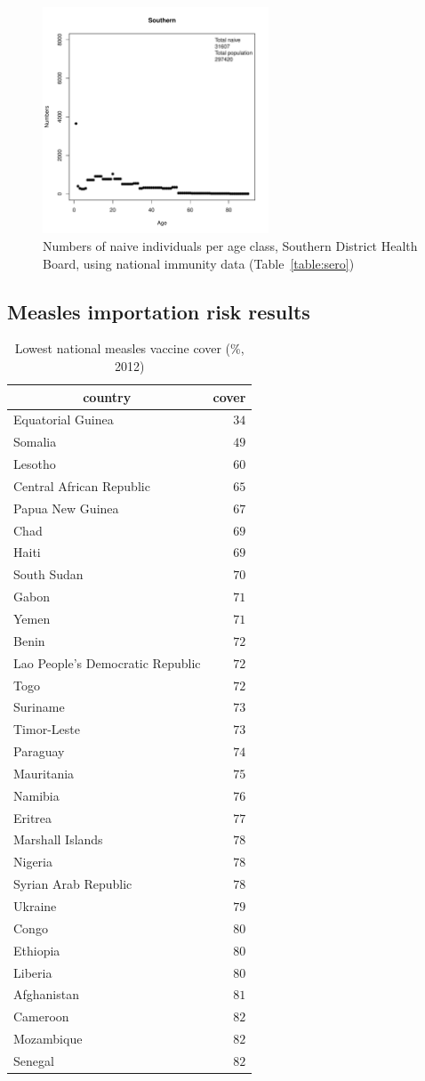 \documentclass{article}
\begin{document}
\begin{figure}[H]
     \begin{center}
     \includegraphics[width=0.6\textwidth]{dhb20.pdf}
     \end{center}
     \caption{Numbers of naive individuals per age class, Southern District Health Board, using national immunity data (Table~\ref{table:sero})}
     \label{fig:Southern}
\end{figure}

\subsection{Measles importation risk results}



\begin{table}
\caption{Lowest national measles vaccine cover (\%, 2012)}
\begin{center}
\begin{tabular}{lr}
\hline\hline
\multicolumn{1}{c}{country}&\multicolumn{1}{c}{cover}\tabularnewline
\hline
Equatorial Guinea&$34$\tabularnewline
Somalia&$49$\tabularnewline
Lesotho&$60$\tabularnewline
Central African Republic&$65$\tabularnewline
Papua New Guinea&$67$\tabularnewline
Chad&$69$\tabularnewline
Haiti&$69$\tabularnewline
South Sudan&$70$\tabularnewline
Gabon&$71$\tabularnewline
Yemen&$71$\tabularnewline
Benin&$72$\tabularnewline
Lao People's Democratic Republic&$72$\tabularnewline
Togo&$72$\tabularnewline
Suriname&$73$\tabularnewline
Timor-Leste&$73$\tabularnewline
Paraguay&$74$\tabularnewline
Mauritania&$75$\tabularnewline
Namibia&$76$\tabularnewline
Eritrea&$77$\tabularnewline
Marshall Islands&$78$\tabularnewline
Nigeria&$78$\tabularnewline
Syrian Arab Republic&$78$\tabularnewline
Ukraine&$79$\tabularnewline
Congo&$80$\tabularnewline
Ethiopia&$80$\tabularnewline
Liberia&$80$\tabularnewline
Afghanistan&$81$\tabularnewline
Cameroon&$82$\tabularnewline
Mozambique&$82$\tabularnewline
Senegal&$82$\tabularnewline
\hline
\end{tabular}\end{center}\label{table:cover12}
\end{table}
\end{document}
